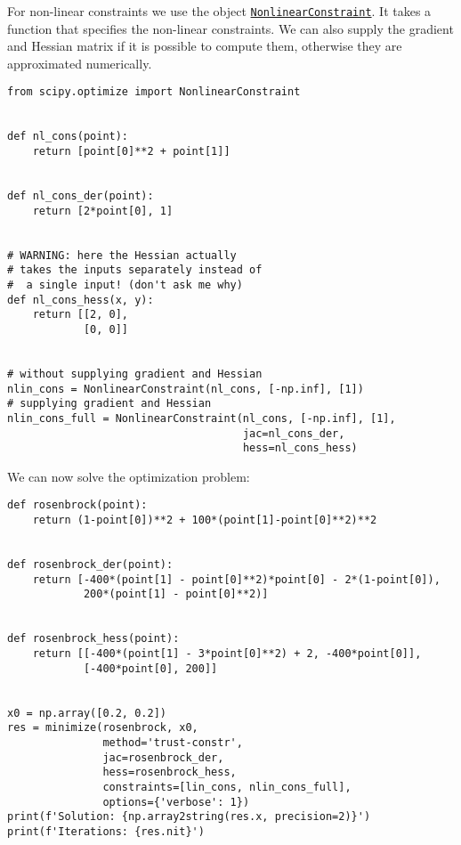 \documentclass[12pt, a4paper]{article}
\begin{document}
For non-linear constraints we use the object \href{https://docs.scipy.org/doc/scipy-1.3.0/reference/generated/scipy.optimize.NonlinearConstraint.html\#scipy.optimize.NonlinearConstraint}{\texttt{NonlinearConstraint}}.
It takes a function that specifies the non-linear constraints.
We can also supply the gradient and Hessian matrix if it is possible to compute them, otherwise they are approximated numerically.
\lstset{language=jupyter-python,label= ,caption= ,captionpos=b,numbers=none}
\begin{lstlisting}
from scipy.optimize import NonlinearConstraint


def nl_cons(point):
    return [point[0]**2 + point[1]]


def nl_cons_der(point):
    return [2*point[0], 1]


# WARNING: here the Hessian actually
# takes the inputs separately instead of
#  a single input! (don't ask me why)
def nl_cons_hess(x, y):
    return [[2, 0],
            [0, 0]]


# without supplying gradient and Hessian
nlin_cons = NonlinearConstraint(nl_cons, [-np.inf], [1])
# supplying gradient and Hessian
nlin_cons_full = NonlinearConstraint(nl_cons, [-np.inf], [1],
                                     jac=nl_cons_der,
                                     hess=nl_cons_hess)
\end{lstlisting}
We can now solve the optimization problem:
\lstset{language=jupyter-python,label= ,caption= ,captionpos=b,numbers=none}
\begin{lstlisting}
def rosenbrock(point):
    return (1-point[0])**2 + 100*(point[1]-point[0]**2)**2


def rosenbrock_der(point):
    return [-400*(point[1] - point[0]**2)*point[0] - 2*(1-point[0]),
            200*(point[1] - point[0]**2)]


def rosenbrock_hess(point):
    return [[-400*(point[1] - 3*point[0]**2) + 2, -400*point[0]],
            [-400*point[0], 200]]


x0 = np.array([0.2, 0.2])
res = minimize(rosenbrock, x0,
               method='trust-constr',
               jac=rosenbrock_der,
               hess=rosenbrock_hess,
               constraints=[lin_cons, nlin_cons_full],
               options={'verbose': 1})
print(f'Solution: {np.array2string(res.x, precision=2)}')
print(f'Iterations: {res.nit}')
\end{lstlisting}
\end{document}
